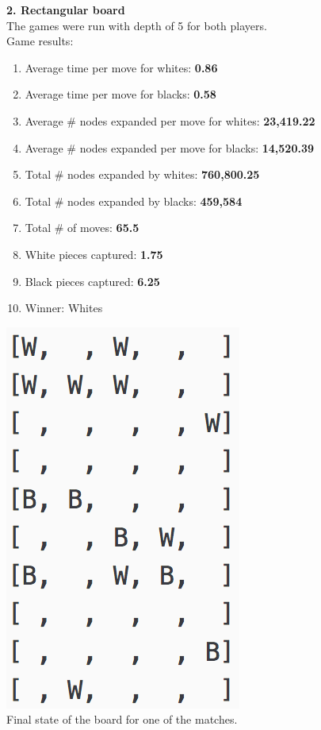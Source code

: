 \documentclass[11pt]{article}
\begin{document}
\textbf{2. Rectangular board}\\
The games were run with depth of 5 for both players.\\
Game results:\\
\begin{enumerate}
\item Average time per move for whites: \textbf{0.86}
\item Average time per move for blacks: \textbf{0.58}
\item Average \# nodes expanded per move for whites: \textbf{23,419.22}
\item Average \# nodes expanded per move for blacks:  \textbf{14,520.39}
\item Total \# nodes expanded by whites: \textbf{760,800.25}
\item Total \# nodes expanded by blacks: \textbf{459,584}
\item Total \# of moves: \textbf{65.5}
\item White pieces captured: \textbf{1.75}
\item Black pieces captured: \textbf{6.25}
\item Winner: Whites
\end{enumerate}
\begin{center}
\includegraphics[scale=1]{part2/ab-o1-vs-ab-d1-rect10x5.png}\\
Final state of the board for one of the matches.
\end{center}
\end{document}

